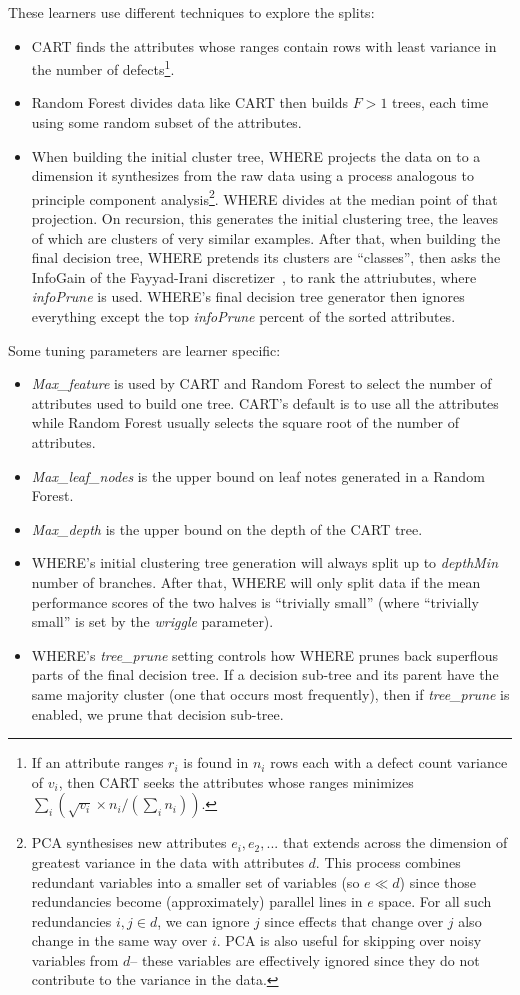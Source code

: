 \documentclass{sig-alternative}
\newcommand{\bi}{\begin{itemize}[leftmargin=0.4cm]}
\newcommand{\ei}{\end{itemize}}
\begin{document}
These learners use different techniques to explore the splits:
\bi
\item
CART finds the attributes whose ranges contain rows with least variance in the number
of defects\footnote{If an attribute ranges $r_i$ is found in 
$n_i$ rows each with a  defect count variance of $v_i$, then CART seeks the attributes
whose ranges minimizes $\sum_i \left(\sqrt{v_i}\times n_i/(\sum_i n_i)\right)$.}.
\item
Random Forest    divides data like CART then  builds $F>1$  trees,
each time using some random subset of
the attributes. 
\item
When building the initial cluster tree, WHERE projects the data on to a dimension it synthesizes from the raw data using
a process analogous to principle component analysis\footnote{
PCA  synthesises  new
attributes $e_i, e_2,...$
that extends across the dimension of greatest  variance in the data  with attributes $d$.  
This process  combines
redundant  variables into a smaller set of variables  (so $e \ll d$) since those
redundancies become (approximately) parallel lines
in $e$ space. For all such redundancies \mbox{$i,j \in d$}, we 
can ignore $j$ 
since effects that change over $j$ also
change in the same way over $i$.
PCA is also useful for skipping over noisy variables from $d$-- these
variables are effectively ignored since    they  do not contribute to the variance in the data.}.
WHERE  divides  at the median point of that projection.
On recursion,
this generates the initial clustering tree, the leaves of which are clusters of  very similar examples. After that, when building 
the final decision tree, WHERE pretends its clusters are ``classes'', then 
asks the InfoGain of the
Fayyad-Irani discretizer~\cite{FayIra93Multi}, to rank the attriubutes, where {\em infoPrune} is used.
WHERE's final decision tree generator then ignores everything except the top   {\em infoPrune} percent of the sorted
attributes.
\ei
Some tuning parameters are learner specific:
\bi
\item
{\em Max\_feature} is used by
CART and Random Forest to select the number of attributes
used to build one tree.
CART's default is to use all the attributes while 
Random Forest usually selects the square root of the number
of attributes.
\item
  {\em Max\_leaf\_nodes} is the upper bound on leaf notes generated in a 
  Random Forest.
\item {\em Max\_depth} is the upper bound on the depth of the CART tree.  
 \item
WHERE's initial clustering
tree generation will always split up to {\em depthMin} number of branches.
After that, WHERE will only split data if the mean performance scores of the two halves
is ``trivially small'' (where ``trivially small'' is set by the   {\em wriggle} parameter). 
\item
WHERE's   {\em tree\_prune} setting controls how   
WHERE prunes back superflous parts of the final decision tree. 
If a decision sub-tree and its parent have the same 
majority cluster
(one that occurs most frequently), then if {\em tree\_prune} is enabled, we prune that decision sub-tree.
\ei
\end{document}

